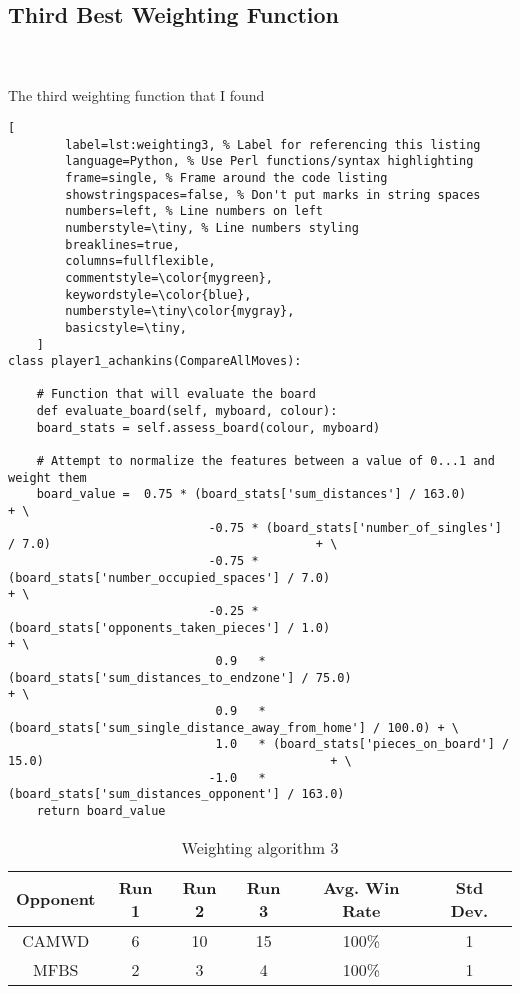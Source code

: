 \documentclass[
	12pt, %
]{fphw}
\begin{document}

\subsection{Third Best Weighting Function}

\hfill\\ \\  The third weighting function that I found

\begin{lstlisting}[
		label=lst:weighting3, % Label for referencing this listing
		language=Python, % Use Perl functions/syntax highlighting
		frame=single, % Frame around the code listing
		showstringspaces=false, % Don't put marks in string spaces
		numbers=left, % Line numbers on left
		numberstyle=\tiny, % Line numbers styling
		breaklines=true,
		columns=fullflexible,
		commentstyle=\color{mygreen},
		keywordstyle=\color{blue},
		numberstyle=\tiny\color{mygray},
		basicstyle=\tiny,
	]
class player1_achankins(CompareAllMoves):

    # Function that will evaluate the board
    def evaluate_board(self, myboard, colour):
    board_stats = self.assess_board(colour, myboard)

    # Attempt to normalize the features between a value of 0...1 and weight them
    board_value =  0.75 * (board_stats['sum_distances'] / 163.0)                                        + \
                            -0.75 * (board_stats['number_of_singles'] / 7.0)                                     + \
                            -0.75 * (board_stats['number_occupied_spaces'] / 7.0)                          + \
                            -0.25 * (board_stats['opponents_taken_pieces'] / 1.0)                            + \
                             0.9   * (board_stats['sum_distances_to_endzone'] / 75.0)                      + \
                             0.9   * (board_stats['sum_single_distance_away_from_home'] / 100.0) + \
                             1.0   * (board_stats['pieces_on_board'] / 15.0)                                        + \
                            -1.0   * (board_stats['sum_distances_opponent'] / 163.0)
    return board_value
\end{lstlisting}

\begin{table}[ht]
	\centering
	\begin{tabular}{||c | c c c c c||}
		\hline
		Opponent & Run 1&   Run 2 & Run 3 & Avg. Win Rate & Std Dev. \\ [0.5ex]
		\hline\hline
		CAMWD &  6 & 10 & 15 & 100\% & 1 \\
		\hline
		MFBS & 2 & 3 & 4 & 100\% & 1 \\ [1ex]
		\hline
	\end{tabular}
	\caption{Weighting algorithm 3}
	\label{table:3}
\end{table}
\end{document}
